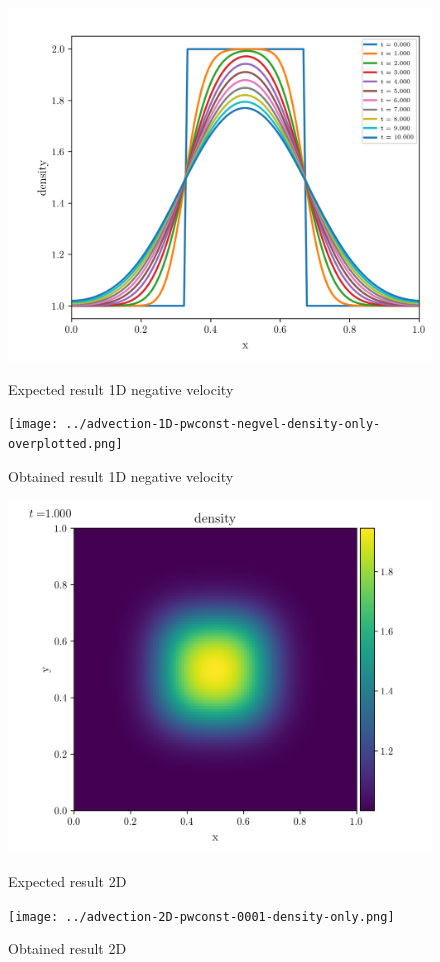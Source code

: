     \begin{figure}[htbp]
        \centering
        \includegraphics[width=.7\textwidth]{./figures/advection-1D-pwconst-negvel-density-only-overplotted.png}%
        \caption{Expected result 1D negative velocity}
        \texttt{[image: ../advection-1D-pwconst-negvel-density-only-overplotted.png]}%
        \caption{Obtained result 1D negative velocity}
    \end{figure}

    \begin{figure}[htbp]
        \centering
        \includegraphics[width=.7\textwidth]{./figures/advection-2D-pwconst-0001-density-only.png}%
        \caption{Expected result 2D}
        \texttt{[image: ../advection-2D-pwconst-0001-density-only.png]}%
        \caption{Obtained result 2D}
    \end{figure}


